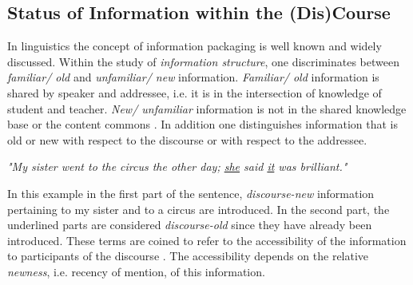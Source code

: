 \documentclass[twoside, 12pt]{article}
\begin{document}

\subsection{Status of Information within the (Dis)Course}
\label{sec:infostatus}

In linguistics the concept of information packaging \cite{CambridgeGrammar:npentrel14} is well known and widely discussed. Within the study of \textit{information structure}, one discriminates between \textit{familiar/ old} and \textit{unfamiliar/ new} information. \textit{Familiar/ old} information is shared by speaker and addressee, i.e. it is in the intersection of knowledge of student and teacher. \textit{New/ unfamiliar} information is not in the shared knowledge base or the content commons \cite{CNX:whitepaper}. In addition one distinguishes information that is old or new with respect to the discourse or with respect to the addressee.

\begin{center}
\textit{"My sister went to the circus the other day; \underline{she} said \underline{it} was brilliant."}\\
\end{center}

In this example in the first part of the sentence, \textit{discourse-new} information pertaining to my sister and to a circus are introduced. In the second part, the underlined parts are considered \textit{discourse-old} since they have already been introduced. These terms are coined to refer to the accessibility of the information to participants of the discourse \cite{Newness:npentrel14}. The accessibility depends on the relative \textit{newness}, i.e. recency of mention, of this information.\\
\end{document}

